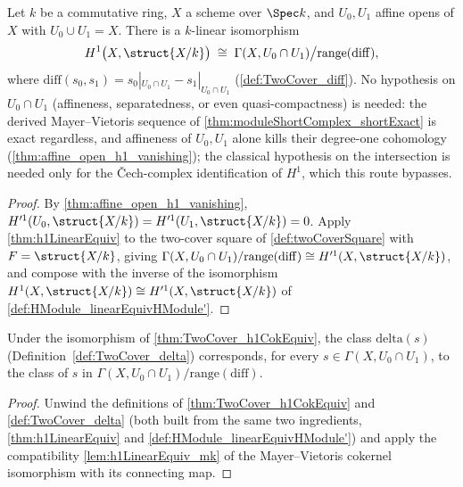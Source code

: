 \begin{theorem}
  \label{thm:TwoCover_h1CokEquiv}
  \leanok
  Let \(k\) be a commutative ring, \(X\) a scheme over \(\Spec k\), and \(U_0, U_1\) affine
  opens of \(X\) with \(U_0 \cup U_1 = X\). There is a \(k\)-linear isomorphism
  \[
    H^1\bigl(X, \struct{X/k}\bigr) \;\cong\; \Gamma(X, U_0 \cap U_1)\big/\mathrm{range}(\mathrm{diff}),
  \]
  where \(\mathrm{diff}(s_0,s_1) = s_0|_{U_0 \cap U_1} - s_1|_{U_0 \cap U_1}\)
  (\ref{def:TwoCover_diff}). No hypothesis on \(U_0 \cap U_1\) (affineness, separatedness, or
  even quasi-compactness) is needed: the derived Mayer--Vietoris sequence of
  \ref{thm:moduleShortComplex_shortExact} is exact regardless, and affineness of \(U_0, U_1\)
  alone kills their degree-one cohomology (\ref{thm:affine_open_h1_vanishing}); the classical
  hypothesis on the intersection is needed only for the \v{C}ech-complex identification of
  \(H^1\), which this route bypasses.
\end{theorem}
\begin{proof}
  \leanok
  By \ref{thm:affine_open_h1_vanishing}, \(H'^1(U_0,\struct{X/k}) = H'^1(U_1,\struct{X/k}) = 0\).
  Apply \ref{thm:h1LinearEquiv} to the two-cover square of \ref{def:twoCoverSquare} with
  \(F = \struct{X/k}\), giving
  \(\Gamma(X, U_0 \cap U_1)/\mathrm{range}(\mathrm{diff}) \cong H'^1(X,\struct{X/k})\), and
  compose with the inverse of the isomorphism
  \(H^1(X,\struct{X/k}) \cong H'^1(X,\struct{X/k})\) of
  \ref{def:HModule_linearEquivHModule'}.
\end{proof}

\begin{lemma}
  \label{lem:TwoCover_h1CokEquiv_delta}
  \leanok
  Under the isomorphism of \ref{thm:TwoCover_h1CokEquiv}, the class
  \(\mathrm{delta}(s)\) (Definition~\ref{def:TwoCover_delta}) corresponds, for every
  \(s \in \Gamma(X, U_0 \cap U_1)\), to the class of \(s\) in
  \(\Gamma(X,U_0 \cap U_1)/\mathrm{range}(\mathrm{diff})\).
\end{lemma}
\begin{proof}
  \leanok
  Unwind the definitions of \ref{thm:TwoCover_h1CokEquiv} and \ref{def:TwoCover_delta} (both
  built from the same two ingredients, \ref{thm:h1LinearEquiv} and
  \ref{def:HModule_linearEquivHModule'}) and apply the compatibility \ref{lem:h1LinearEquiv_mk}
  of the Mayer--Vietoris cokernel isomorphism with its connecting map.
\end{proof}

